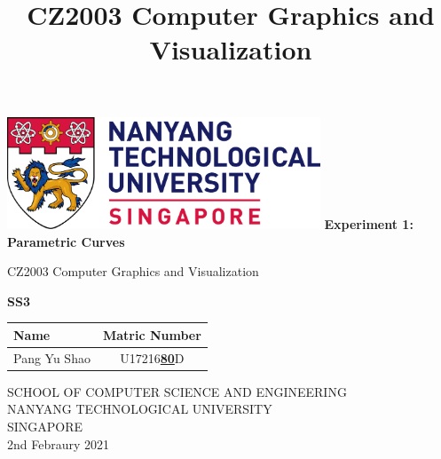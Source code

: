 \documentclass[acmlarge,nonacm=true]{acmart}
\begin{document}
	
	\begin{titlepage}
		\begin{center}
			\vspace*{1cm}
			\includegraphics[width=0.7\textwidth]{fig/ntu_logo}
			\vspace{0.8cm}
			\linebreak
			\Huge
			\textbf{Experiment 1: Parametric Curves}
			
			\vspace{0.5cm}
			\LARGE
			CZ2003 Computer Graphics and Visualization
			
			\vspace{1.5cm}
			\textbf{SS3}\\
			
			\begin{table}[h]
				\begin{tabular}{lc}
					Name & Matric Number \\\hline
					Pang Yu Shao & U17216\underline{\textbf{80}}D \\
				\end{tabular}
			\end{table}
			
			
			
			\vfill
			
			\vspace{0.8cm}
			
			
			
			\Large
			SCHOOL OF COMPUTER SCIENCE AND ENGINEERING\\
			NANYANG TECHNOLOGICAL UNIVERSITY\\
			SINGAPORE\\
			2nd Febraury 2021
			
		\end{center}
	\end{titlepage}

 

\title{CZ2003 Computer Graphics and Visualization}

\end{document}
